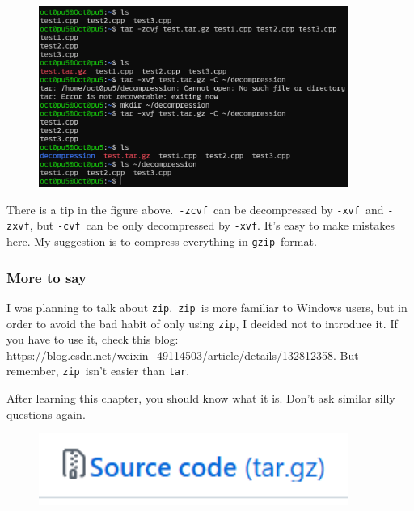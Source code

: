 \documentclass[12pt]{ctexart}
\begin{document}
\begin{figure}[H]
    \centering
    \includegraphics[width=0.9\textwidth,keepaspectratio]{assets/Linux/1.12 Linux compression commands/1.png}
\end{figure}

There is a tip in the figure above.\ \texttt{-zcvf}\ can be decompressed
by \texttt{-xvf}\ and \texttt{-zxvf}, but \texttt{-cvf}\ can be only
decompressed by \texttt{-xvf}. It's easy to make
mistakes here. My suggestion is to compress everything in \texttt{gzip}\
format.

\subsubsection{\textbf{More to say}}

I was planning to talk about \texttt{zip}.\ \texttt{zip}\ is more familiar
to Windows users, but in order to avoid the bad habit of only using
\texttt{zip}, I decided not to introduce it. If you have to use it,
check this blog:
\url{https://blog.csdn.net/weixin_49114503/article/details/132812358}.
But remember, \texttt{zip}\ isn't easier than
\texttt{tar}.

After learning this chapter, you should know what it is.
Don't ask similar silly questions again.

\begin{figure}[H]
    \centering
    \includegraphics[width=0.9\textwidth,keepaspectratio]{assets/Linux/1.12 Linux compression commands/2.png}
\end{figure}
\end{document}
